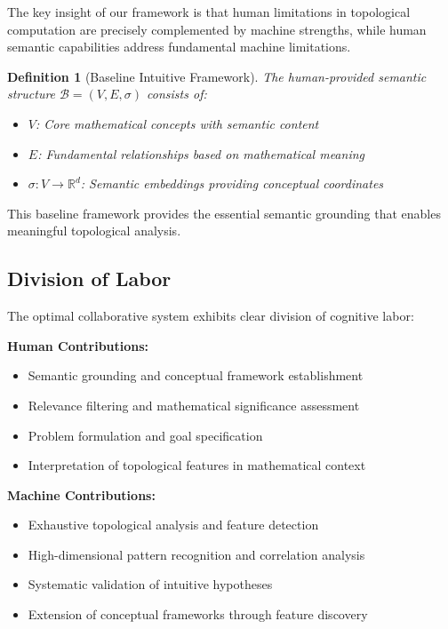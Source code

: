 \documentclass[11pt]{article}
\newtheorem{definition}[theorem]{Definition}
\newcommand{\R}{\mathbb{R}}
\newcommand{\B}{\mathcal{B}}
\begin{document}
The key insight of our framework is that human limitations in topological computation are precisely complemented by machine strengths, while human semantic capabilities address fundamental machine limitations.

\begin{definition}[Baseline Intuitive Framework]
The human-provided semantic structure $\B = (V, E, \sigma)$ consists of:
\begin{itemize}
\item $V$: Core mathematical concepts with semantic content
\item $E$: Fundamental relationships based on mathematical meaning
\item $\sigma: V \to \R^d$: Semantic embeddings providing conceptual coordinates
\end{itemize}
\end{definition}

This baseline framework provides the essential semantic grounding that enables meaningful topological analysis.

\subsection{Division of Labor}

The optimal collaborative system exhibits clear division of cognitive labor:

\textbf{Human Contributions:}
\begin{itemize}
\item Semantic grounding and conceptual framework establishment
\item Relevance filtering and mathematical significance assessment
\item Problem formulation and goal specification
\item Interpretation of topological features in mathematical context
\end{itemize}

\textbf{Machine Contributions:}
\begin{itemize}
\item Exhaustive topological analysis and feature detection
\item High-dimensional pattern recognition and correlation analysis
\item Systematic validation of intuitive hypotheses
\item Extension of conceptual frameworks through feature discovery
\end{itemize}
\end{document}
